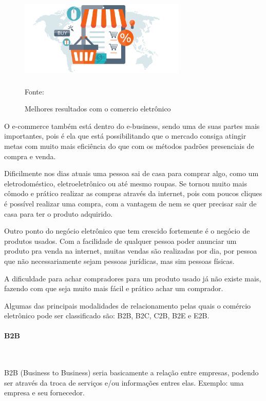  \begin{figure}[!h]
	\centering
	\caption{Melhores resultados com o comercio eletrônico}
	\includegraphics[width=300px, height=150px]{./images/2-6.png}
	\par{Fonte: \cite{3webbox}}
\end{figure}
\newpage

O e-commerce também está dentro do e-business, sendo uma de suas partes mais importantes, pois é ela que está possibilitando que o mercado consiga atingir metas com muito mais eficiência do que com os métodos padrões presenciais de compra e venda.

Dificilmente nos dias atuais uma pessoa sai de casa para comprar algo, como um eletrodoméstico, eletroeletrônico ou até mesmo roupas. Se tornou muito mais cômodo e prático realizar as compras através da internet, pois com poucos cliques é possível realizar uma compra, com a vantagem de nem se quer precisar sair de casa para ter o produto adquirido.

Outro ponto do negócio eletrônico que tem crescido fortemente é o negócio de produtos usados. Com a facilidade de qualquer pessoa poder anunciar um produto pra venda na internet, muitas vendas são realizadas por dia, por pessoa que não necessariamente sejam pessoas jurídicas, mas sim pessoas físicas.

A dificuldade para achar compradores para um produto usado já não existe mais, fazendo com que seja muito mais fácil e prático achar um comprador.

Algumas das principais modalidades de relacionamento pelas quais o comércio eletrônico pode ser classificado são: B2B, B2C, C2B, B2E e E2B.

\paragraph{B2B}\mbox{}\\
\par
B2B (Business to Business) seria basicamente a relação entre empresas, podendo ser através da troca de serviços e/ou informações entres elas. Exemplo: uma empresa e seu fornecedor.
\newpage
